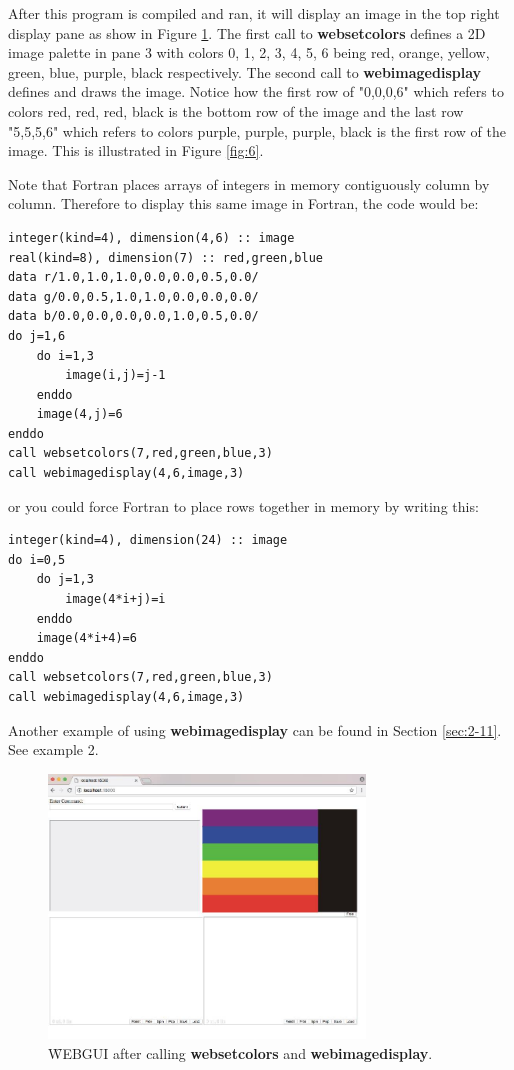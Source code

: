 After this program is compiled and ran, it will display an image in the top right display pane as show in Figure \ref{fig:5}.
The first call to \textbf{websetcolors} defines a 2D image palette in pane 3 with colors 0, 1, 2, 3, 4, 5, 6 being red, orange, yellow, green, 
blue, purple, black respectively. The second call to \textbf{webimagedisplay} defines and draws the image.
Notice how the first row of "0,0,0,6" which refers to colors red, red, red, black is the bottom row of the image and the last
row "5,5,5,6" which refers to colors purple, purple, purple, black is the first row of the image. This is illustrated in Figure \ref{fig:6}.

Note that Fortran places arrays of integers in memory contiguously column by column. Therefore to display this same image 
in Fortran, the code would be:

\begin{verbatim}
integer(kind=4), dimension(4,6) :: image
real(kind=8), dimension(7) :: red,green,blue
data r/1.0,1.0,1.0,0.0,0.0,0.5,0.0/
data g/0.0,0.5,1.0,1.0,0.0,0.0,0.0/
data b/0.0,0.0,0.0,0.0,1.0,0.5,0.0/
do j=1,6
    do i=1,3
        image(i,j)=j-1
    enddo
    image(4,j)=6
enddo
call websetcolors(7,red,green,blue,3)
call webimagedisplay(4,6,image,3)
\end{verbatim}

or you could force Fortran to place rows together in memory by writing this:

\begin{verbatim}
integer(kind=4), dimension(24) :: image
do i=0,5
    do j=1,3
        image(4*i+j)=i
    enddo
    image(4*i+4)=6
enddo
call websetcolors(7,red,green,blue,3)
call webimagedisplay(4,6,image,3)
\end{verbatim}

Another example of using \textbf{webimagedisplay} can be found in Section \ref{sec:2-11}. See example 2.

\newpage
\begin{figure}[H]
\centering
\includegraphics[width=0.75\textwidth]{pix/image2.jpg}
\caption{\f{WEBGUI} after calling \textbf{websetcolors} and \textbf{webimagedisplay}.}
\label{fig:5}
\end{figure} 

